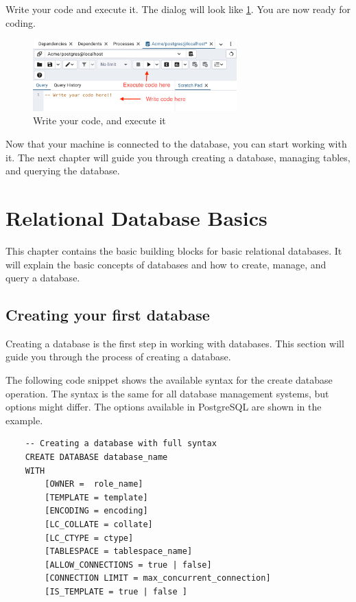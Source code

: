 Write your code and execute it. The dialog will look like \cref{fig:1.pgadmin9}. You are now ready for coding.

\begin{figure}[H]
    \centering
    \includegraphics[width=0.7\textwidth]{content/1-relational-databases/figures/pgadmin/9.png}
    \caption{Write your code, and execute it}
    \label{fig:1.pgadmin9}
\end{figure}

Now that your machine is connected to the database, you can start working with it. The next chapter will guide you through creating a database, managing tables, and querying the database.


\chapter{Relational Database Basics}
\label{chap:relational:relational-database-basics}
This chapter contains the basic building blocks for basic relational databases.
It will explain the basic concepts of databases and how to create, manage, and query a database.

\section{Creating your first database}
Creating a database is the first step in working with databases. This section will guide you through the process of creating a database. 

The following code snippet shows the available syntax for the create database operation. The syntax is the same for all database management systems, but options might differ. The options available in PostgreSQL are shown in the example.

\begin{verbatim}
    -- Creating a database with full syntax
    CREATE DATABASE database_name
    WITH
        [OWNER =  role_name]
        [TEMPLATE = template]
        [ENCODING = encoding]
        [LC_COLLATE = collate]
        [LC_CTYPE = ctype]
        [TABLESPACE = tablespace_name]
        [ALLOW_CONNECTIONS = true | false]
        [CONNECTION LIMIT = max_concurrent_connection]
        [IS_TEMPLATE = true | false ]
\end{verbatim}

